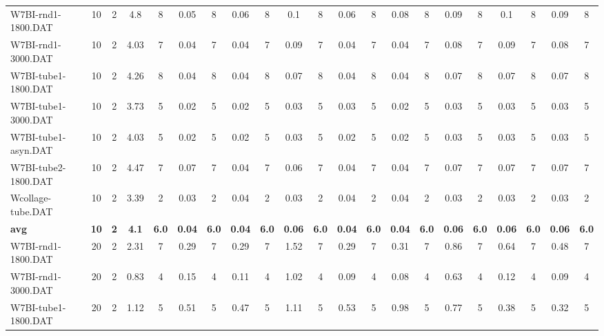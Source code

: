 \begin{sidewaystable}[!ht]
{\begin{tabular}{lcccccccccccccccccccc}
W7BI-rnd1-1800.DAT & 10 & 2 & 4.8 & 8 &  \textcolor{blue2}{0.05} & 8 & 0.06 & 8 & 0.1 & 8 & 0.06 & 8 & 0.08 & 8 & 0.09 & 8 & 0.1 & 8 & 0.09 & 8 \\
W7BI-rnd1-3000.DAT & 10 & 2 & 4.03 & 7 &  \textcolor{blue2}{0.04} & 7 &  \textcolor{blue2}{0.04} & 7 & 0.09 & 7 &  \textcolor{blue2}{0.04} & 7 &  \textcolor{blue2}{0.04} & 7 & 0.08 & 7 & 0.09 & 7 & 0.08 & 7 \\
W7BI-tube1-1800.DAT & 10 & 2 & 4.26 & 8 &  \textcolor{blue2}{0.04} & 8 &  \textcolor{blue2}{0.04} & 8 & 0.07 & 8 &  \textcolor{blue2}{0.04} & 8 &  \textcolor{blue2}{0.04} & 8 & 0.07 & 8 & 0.07 & 8 & 0.07 & 8 \\
W7BI-tube1-3000.DAT & 10 & 2 & 3.73 & 5 &  \textcolor{blue2}{0.02} & 5 &  \textcolor{blue2}{0.02} & 5 & 0.03 & 5 & 0.03 & 5 &  \textcolor{blue2}{0.02} & 5 & 0.03 & 5 & 0.03 & 5 & 0.03 & 5 \\
W7BI-tube1-asyn.DAT & 10 & 2 & 4.03 & 5 &  \textcolor{blue2}{0.02} & 5 &  \textcolor{blue2}{0.02} & 5 & 0.03 & 5 &  \textcolor{blue2}{0.02} & 5 &  \textcolor{blue2}{0.02} & 5 & 0.03 & 5 & 0.03 & 5 & 0.03 & 5 \\
W7BI-tube2-1800.DAT & 10 & 2 & 4.47 & 7 & 0.07 & 7 &  \textcolor{blue2}{0.04} & 7 & 0.06 & 7 &  \textcolor{blue2}{0.04} & 7 &  \textcolor{blue2}{0.04} & 7 & 0.07 & 7 & 0.07 & 7 & 0.07 & 7 \\
Wcollage-tube.DAT & 10 & 2 & 3.39 & 2 &  \textcolor{blue2}{0.03} & 2 & 0.04 & 2 &  \textcolor{blue2}{0.03} & 2 & 0.04 & 2 & 0.04 & 2 &  \textcolor{blue2}{0.03} & 2 &  \textcolor{blue2}{0.03} & 2 &  \textcolor{blue2}{0.03} & 2 \\
\cline{1-21} \textbf{avg} & \textbf{10} & \textbf{2} & \textbf{4.1} & \textbf{6.0} & \textbf{0.04} & \textbf{6.0} & \textbf{0.04} & \textbf{6.0} & \textbf{0.06} & \textbf{6.0} & \textbf{0.04} & \textbf{6.0} & \textbf{0.04} & \textbf{6.0} & \textbf{0.06} & \textbf{6.0} & \textbf{0.06} & \textbf{6.0} & \textbf{0.06} & \textbf{6.0} \\ \cline{1-21}
W7BI-rnd1-1800.DAT & 20 & 2 & 2.31 & 7 &  \textcolor{blue2}{0.29} & 7 &  \textcolor{blue2}{0.29} & 7 & 1.52 & 7 &  \textcolor{blue2}{0.29} & 7 & 0.31 & 7 & 0.86 & 7 & 0.64 & 7 & 0.48 & 7 \\
W7BI-rnd1-3000.DAT & 20 & 2 & 0.83 & 4 & 0.15 & 4 & 0.11 & 4 & 1.02 & 4 & 0.09 & 4 &  \textcolor{blue2}{0.08} & 4 & 0.63 & 4 & 0.12 & 4 & 0.09 & 4 \\
W7BI-tube1-1800.DAT & 20 & 2 & 1.12 & 5 & 0.51 & 5 & 0.47 & 5 & 1.11 & 5 & 0.53 & 5 & 0.98 & 5 & 0.77 & 5 & 0.38 & 5 &  \textcolor{blue2}{0.32} & 5 \\

\end{tabular}}
\end{sidewaystable}
